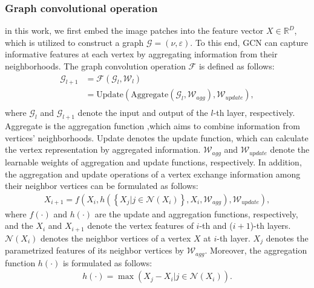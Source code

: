 \documentclass[journal]{IEEEtran}
\begin{document}
\subsubsection{Graph convolutional operation} in this work, we first embed the image patches into the feature vector $X\in {{\mathbb{R}}^{D}}$, which is utilized to construct a graph $\mathcal{G}=\left( \nu ,\varepsilon  \right)$. To this end, GCN can capture informative features at each vertex by aggregating information from their neighborhoods. The graph convolution operation $\mathsf{\mathcal{F}}$ is defined as follows:
\begin{equation}
\begin{split}
 {{\mathcal{G}}_{l+1}}&=\mathcal{F}\left( {{\mathcal{G}}_{l}},{{\mathcal{W}}_{l}} \right) \\ 
 & =\text{Update}\left( \text{Aggregate}\left( {{\mathcal{G}}_{l}},{{\mathcal{W}}_{agg}} \right),{{\mathcal{W}}_{update}} \right), \\
\end{split}
\end{equation}
where ${{\mathsf{\mathcal{G}}}_{l}}$ and ${{\mathsf{\mathcal{G}}}_{l+1}}$ denote the input and output of the $l$-th layer, respectively. Aggregate is the aggregation function ,which aims to combine information from vertices' neighborhoods. Update denotes the update function, which can calculate the vertex representation by aggregated information. ${{\mathcal{W}}_{agg}}$ and ${{\mathcal{W}}_{update}}$ denote the learnable weights of aggregation and update functions, respectively. In addition, the aggregation and update operations of a vertex exchange information among their neighbor vertices can be formulated as follows:
\begin{equation}
\begin{split}
{{X}_{i+1}}=f\left( {{X}_{i}},h\left( \left\{ {{X}_{j}}|j\in \mathsf{\mathcal{N}}\left( {{X}_{i}} \right) \right\},{{X}_{i}},{{\mathsf{\mathcal{W}}}_{agg}} \right),{{\mathsf{\mathcal{W}}}_{update}} \right),
\end{split}
\end{equation}
where $f\left( \cdot  \right)$ and $h\left( \cdot  \right)$ are the update and aggregation functions, respectively, and the ${{X}_{i}}$ and ${{X}_{i+1}}$ denote the vertex features of $i$-th and ($i+1$)-th layers. $\mathsf{\mathcal{N}}\left( {{X}_{i}} \right)$ denotes the neighbor vertices of a vertex $X$ at $i$-th layer. ${{X}_{j}}$ denotes the parametrized features of its neighbor vertices by ${{\mathsf{\mathcal{W}}}_{agg}}$. Moreover, the aggregation function $h\left( \cdot  \right)$ is formulated as follows:
\begin{equation}
\begin{split}
h\left( \cdot  \right)=\max \left( {{X}_{j}}-{{X}_{i}}|j\in \mathsf{\mathcal{N}}\left( {{X}_{i}} \right) \right).
\end{split}
\end{equation}
\end{document}
